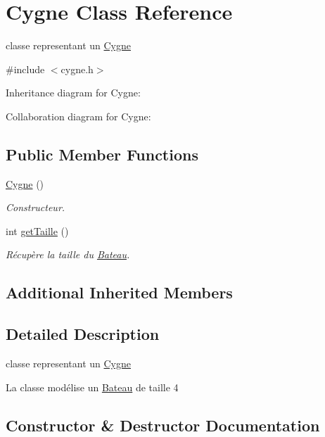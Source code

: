 \hypertarget{class_cygne}{}\section{Cygne Class Reference}
\label{class_cygne}


classe representant un \hyperlink{class_cygne}{Cygne}  




{\ttfamily \#include $<$cygne.\+h$>$}



Inheritance diagram for Cygne\+:


Collaboration diagram for Cygne\+:
\subsection*{Public Member Functions}
\begin{DoxyCompactItemize}
\item 
\hyperlink{class_cygne_a5e27cc91418516c85dbffb6b032f9588}{Cygne} ()
\begin{DoxyCompactList}\small\item\em Constructeur. \end{DoxyCompactList}\item 
int \hyperlink{class_cygne_a48ec6800d6f11358be648cbe9a5fceb0}{get\+Taille} ()
\begin{DoxyCompactList}\small\item\em Récupère la taille du \hyperlink{class_bateau}{Bateau}. \end{DoxyCompactList}\end{DoxyCompactItemize}
\subsection*{Additional Inherited Members}


\subsection{Detailed Description}
classe representant un \hyperlink{class_cygne}{Cygne} 

La classe modélise un \hyperlink{class_bateau}{Bateau} de taille 4 

\subsection{Constructor \& Destructor Documentation}
